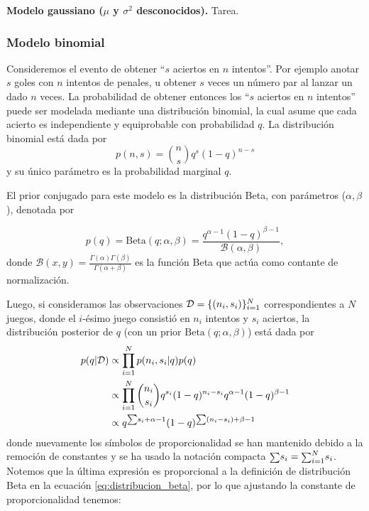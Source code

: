 \textbf{Modelo gaussiano ($\mu$ y $\sigma^2$ desconocidos).} Tarea. 


\subsubsection{Modelo binomial}

Consideremos el evento de obtener ``$s$ aciertos en $n$ intentos''. Por ejemplo anotar $s$ goles con $n$ intentos de penales, u obtener $s$ veces un número par al lanzar un dado $n$ veces. La probabilidad de obtener entonces los ``$s$ aciertos en $n$ intentos'' puede ser modelada mediante una distribución binomial, la cual asume que cada acierto es independiente y  equiprobable con probabilidad $q$. La distribución binomial está dada por
\begin{equation}
	p(n, s) = \binom{n}{s} q^s (1-q)^{n-s}
\end{equation}
y su único parámetro es la probabilidad marginal $q$.

El prior conjugado para este modelo es la distribución Beta, con parámetros ($\alpha, \beta$), denotada por 

\begin{equation}
	p(q) = \text{Beta}(q;\alpha,\beta) = \frac{q^{\alpha-1}(1-q)^{\beta-1}}{\mathcal{B}(\alpha, \beta)},
	\label{eq:distribucion_beta}
\end{equation}
donde $\mathcal{B}(x,y) = \frac{\Gamma(\alpha)\Gamma(\beta)}{\Gamma(\alpha+\beta)}$ es la función Beta que actúa como contante de normalización.


Luego, si consideramos las observaciones ${\mathcal D} = \{(n_i,s_i)\}_{i=1}^N$ correspondientes a $N$ juegos, donde el $i$-ésimo juego consistió en $n_i$ intentos y $s_i$ aciertos, la distribución posterior de $q$ (con un prior $\text{Beta}(q;\alpha,\beta)$) está dada por
\begin{align}
	p(q|{\mathcal D}) & 	\propto \prod_{i=1}^N  p(n_i,s_i|q)p(q)  \\
			 & \propto  \prod_{i=1}^N\binom{n_i}{s_i}q^{s_i}(1-q)^{n_i-s_i}q^{\alpha-1}(1-q)^{\beta-1} \nonumber\\
			 & \propto  q^{{\scriptstyle\sum} s_i + \alpha - 1}(1-q)^{{\scriptstyle\sum} (n_i-s_i) + \beta-1} \nonumber
\end{align}
donde nuevamente los símbolos de proporcionalidad se han mantenido debido a la remoción de constantes y se ha usado la notación compacta ${\scriptstyle\sum} s_i = {\scriptstyle\sum}_{i=1}^N s_i$. Notemos que la última expresión es proporcional a la definición de distribución Beta en la ecuación \eqref{eq:distribucion_beta}, por lo que ajustando la constante de proporcionalidad tenemos: 


